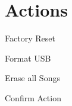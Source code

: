 \section{Actions}

Factory Reset


Format USB

Erase all Songs














































Confirm Action
